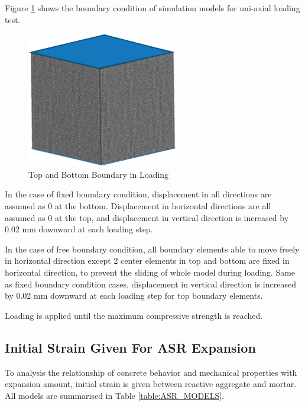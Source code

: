 Figure \ref{boundary1} shows the boundary condition of simulation models for uni-axial loading test.

\begin{figure}[h!]
  \centering
  \includegraphics{Files/Background/LOAD.png}
  \caption{Top and Bottom Boundary in Loading}
  \label{boundary1}
\end{figure}

In the case of fixed boundary condition, displacement in all directions are assumed as 0 at the bottom. Displacement in horizontal directions are all assumed as 0 at the top, and displacement in vertical direction is increased by 0.02 mm downward at each loading step.

In the case of free boundary condition, all boundary elements able to move freely in horizontal direction except 2 center elements in top and bottom are fixed in horizontal direction, to prevent the sliding of whole model during loading. Same as fixed boundary condition cases, displacement in vertical direction is increased by 0.02 mm downward at each loading step for top boundary elements.

Loading is applied until the maximum compressive strength is reached.

\subsection{Initial Strain Given For ASR Expansion}

To analysis the relationship of concrete behavior and mechanical properties with expansion amount, initial strain is given between reactive aggregate and mortar. All models are summarised in Table \ref{table:ASR_MODELS}.

